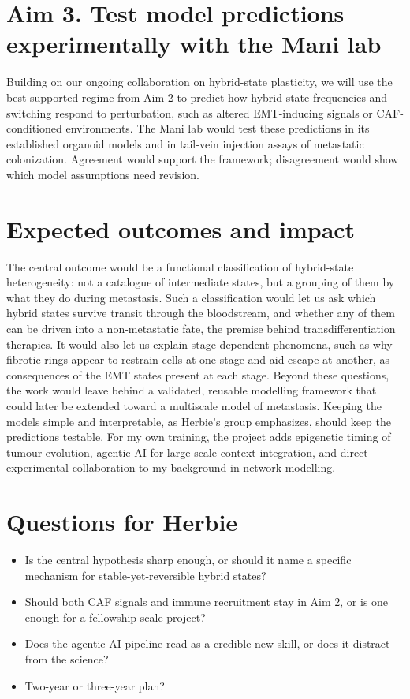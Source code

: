 \documentclass[11pt]{article}
\begin{document}
\section{Aim 3. Test model predictions experimentally with the Mani lab}

Building on our ongoing collaboration on hybrid-state plasticity, we will use the best-supported regime from Aim 2 to predict how hybrid-state frequencies and switching respond to perturbation, such as altered EMT-inducing signals or CAF-conditioned environments. The Mani lab would test these predictions in its established organoid models and in tail-vein injection assays of metastatic colonization. Agreement would support the framework; disagreement would show which model assumptions need revision.

\section{Expected outcomes and impact}

The central outcome would be a functional classification of hybrid-state heterogeneity: not a catalogue of intermediate states, but a grouping of them by what they do during metastasis. Such a classification would let us ask which hybrid states survive transit through the bloodstream, and whether any of them can be driven into a non-metastatic fate, the premise behind transdifferentiation therapies. It would also let us explain stage-dependent phenomena, such as why fibrotic rings appear to restrain cells at one stage and aid escape at another, as consequences of the EMT states present at each stage. Beyond these questions, the work would leave behind a validated, reusable modelling framework that could later be extended toward a multiscale model of metastasis. Keeping the models simple and interpretable, as Herbie's group emphasizes, should keep the predictions testable. For my own training, the project adds epigenetic timing of tumour evolution, agentic AI for large-scale context integration, and direct experimental collaboration to my background in network modelling.

\section{Questions for Herbie}
\begin{itemize}[leftmargin=*,itemsep=1pt,topsep=2pt]
  \item Is the central hypothesis sharp enough, or should it name a specific mechanism for stable-yet-reversible hybrid states?
  \item Should both CAF signals and immune recruitment stay in Aim 2, or is one enough for a fellowship-scale project?
  \item Does the agentic AI pipeline read as a credible new skill, or does it distract from the science?
  \item Two-year or three-year plan?
\end{itemize}
\end{document}
